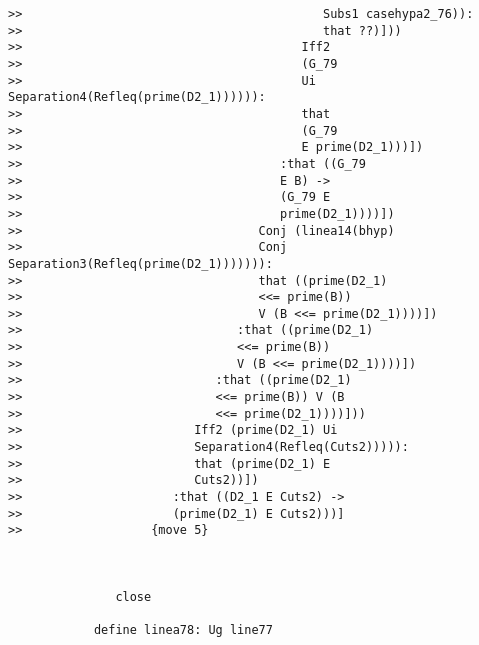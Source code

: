 \documentclass[12pt]{article}
\begin{document}
\begin{verbatim}
>>                                          Subs1 casehypa2_76)):
>>                                          that ??)]))
>>                                       Iff2
>>                                       (G_79
>>                                       Ui Separation4(Refleq(prime(D2_1)))))):
>>                                       that
>>                                       (G_79
>>                                       E prime(D2_1)))])
>>                                    :that ((G_79
>>                                    E B) ->
>>                                    (G_79 E
>>                                    prime(D2_1))))])
>>                                 Conj (linea14(bhyp)
>>                                 Conj Separation3(Refleq(prime(D2_1))))))):
>>                                 that ((prime(D2_1)
>>                                 <<= prime(B))
>>                                 V (B <<= prime(D2_1))))])
>>                              :that ((prime(D2_1)
>>                              <<= prime(B))
>>                              V (B <<= prime(D2_1))))])
>>                           :that ((prime(D2_1)
>>                           <<= prime(B)) V (B
>>                           <<= prime(D2_1))))]))
>>                        Iff2 (prime(D2_1) Ui
>>                        Separation4(Refleq(Cuts2))))):
>>                        that (prime(D2_1) E
>>                        Cuts2))])
>>                     :that ((D2_1 E Cuts2) ->
>>                     (prime(D2_1) E Cuts2)))]
>>                  {move 5}



               close

            define linea78: Ug line77


\end{verbatim}
\end{document}
